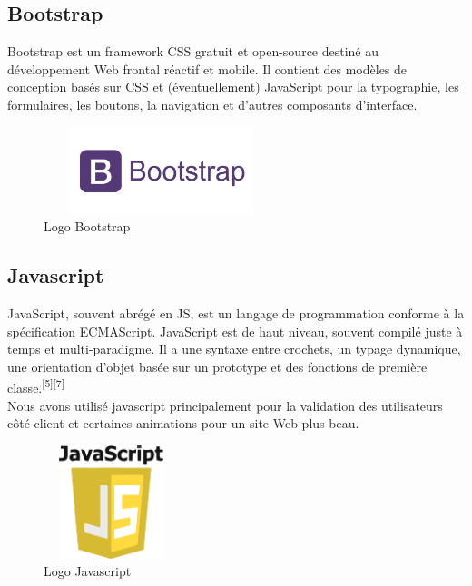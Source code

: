 \documentclass[12pt]{report}
\begin{document}
\subsection{Bootstrap}

Bootstrap est un framework CSS gratuit et open-source destiné au développement Web frontal réactif et mobile. Il contient des modèles de conception basés sur CSS et (éventuellement) JavaScript pour la typographie, les formulaires, les boutons, la navigation et d'autres composants d'interface.

\vspace{-0.1in}

\begin{figure}[h]
\centering
    \includegraphics[width = 2.7in, height = 1in]{../Images/Bootstrap.png}
\vspace{-0.2in}
\caption{Logo Bootstrap}
\end{figure}

\vspace*{-0.3in}

\subsection{Javascript}

JavaScript, souvent abrégé en JS, est un langage de programmation conforme à la spécification ECMAScript. JavaScript est de haut niveau, souvent compilé juste à temps et multi-paradigme. Il a une syntaxe entre crochets, un typage dynamique, une orientation d'objet basée sur un prototype et des fonctions de première classe.\textsuperscript{[5][7]}
\\
Nous avons utilisé javascript principalement pour la validation des utilisateurs côté client et certaines animations pour un site Web plus beau.

\begin{figure}[h]
\centering
    \includegraphics[width = 1.55in, height = 1.3in]{../Images/JS.png}
\caption{Logo Javascript}
\end{figure}
\end{document}
